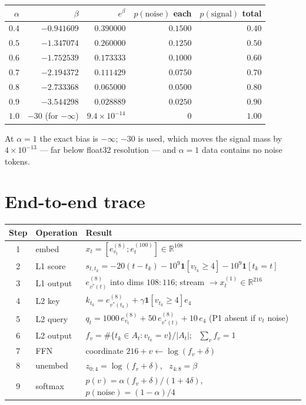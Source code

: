 \documentclass[11pt]{article}
\newcommand{\R}{\mathbb{R}}
\begin{document}
\begin{center}
\begin{tabular}{@{}rrrrr@{}}
\toprule
$\alpha$ & $\beta$ & $e^{\beta}$ & $p(\text{noise})$ each & $p(\text{signal})$ total\\
\midrule
$0.4$ & $-0.941609$ & $0.390000$ & $0.1500$ & $0.40$\\
$0.5$ & $-1.347074$ & $0.260000$ & $0.1250$ & $0.50$\\
$0.6$ & $-1.752539$ & $0.173333$ & $0.1000$ & $0.60$\\
$0.7$ & $-2.194372$ & $0.111429$ & $0.0750$ & $0.70$\\
$0.8$ & $-2.733368$ & $0.065000$ & $0.0500$ & $0.80$\\
$0.9$ & $-3.544298$ & $0.028889$ & $0.0250$ & $0.90$\\
$1.0$ & $-30$ (for $-\infty$) & $9.4\times10^{-14}$ & $0$ & $1.00$\\
\bottomrule
\end{tabular}
\end{center}
At $\alpha=1$ the exact bias is $-\infty$; $-30$ is used, which moves the signal mass by
$4\times10^{-13}$ --- far below float32 resolution --- and $\alpha=1$ data contains no noise tokens.

\section{End-to-end trace}
\begin{center}
\begin{tabular}{@{}clp{10.4cm}@{}}
\toprule
\textbf{Step} & \textbf{Operation} & \textbf{Result}\\
\midrule
1 & embed & $x_t=[e^{(8)}_{v_t};e^{(100)}_t]\in\R^{108}$\\
2 & L1 score & $s_{t,t_k}=-20(t-t_k)-10^9\bm{1}[v_{t_k}\!\ge\!4]-10^9\bm{1}[t_k\!=\!t]$\\
3 & L1 output & $e^{(8)}_{v^*(t)}$ into dims $108{:}116$; stream $\to x^{(1)}_t\in\R^{216}$\\
4 & L2 key & $k_{t_k}=e^{(8)}_{v^*(t_k)}+\gamma\bm{1}[v_{t_k}\!\ge\!4]e_4$\\
5 & L2 query & $q_t=1000\,e^{(8)}_{v_t}+50\,e^{(8)}_{v^*(t)}+10\,e_4$ (P1 absent if $v_t$ noise)\\
6 & L2 output & $f_v=\#\{t_k\in A_t: v_{t_k}=v\}/|A_t|$; \ $\sum_v f_v=1$\\
7 & FFN & coordinate $216{+}v \leftarrow \log(f_v+\delta)$\\
8 & unembed & $z_{0:4}=\log(f_v+\delta)$, \ $z_{4:8}=\beta$\\
9 & softmax & $p(v)=\alpha(f_v+\delta)/(1+4\delta)$, \ $p(\text{noise})=(1-\alpha)/4$\\
\bottomrule
\end{tabular}
\end{center}
\end{document}

